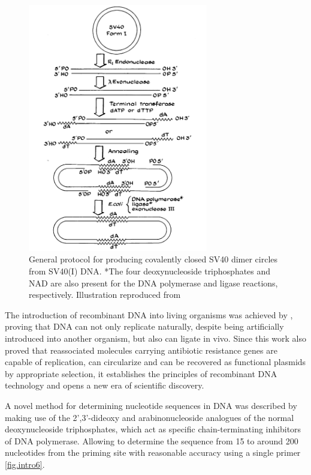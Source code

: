 \begin{figure}[!ht]
  \centering
  \includegraphics[width=0.7\textwidth]{introduction/chapter/figs/recombinant.png}
  \caption{General protocol for producing covalently closed
SV40 dimer circles from SV40(I) DNA. *The four deoxynucleoside triphosphates and NAD are also present for the DNA polymerase and ligase reactions, respectively. Illustration reproduced from \citet{jackson1972biochemical}}
  \label{fig.intro3}
\end{figure}

The introduction of recombinant DNA into living organisms was achieved by \citet{cohen1973construction}, proving that DNA can not only replicate naturally, despite being artificially introduced into another organism, but also can ligate in vivo. Since this work also proved that reassociated molecules carrying antibiotic resistance genes are capable of replication, can circularize and can be recovered as functional plasmids by appropriate selection, it establishes the principles of recombinant DNA technology and opens a new era of scientific discovery. 

A novel method for determining nucleotide sequences in DNA was described by \citet{sanger1977dna} making use of the 2',3'-dideoxy and arabinonucleoside analogues of the normal deoxynucleoside triphosphates, which act as specific chain-terminating inhibitors of DNA polymerase. Allowing to determine the sequence from 15 to around 200 nucleotides from the priming site with reasonable accuracy using a single primer \ref{fig.intro6}.

